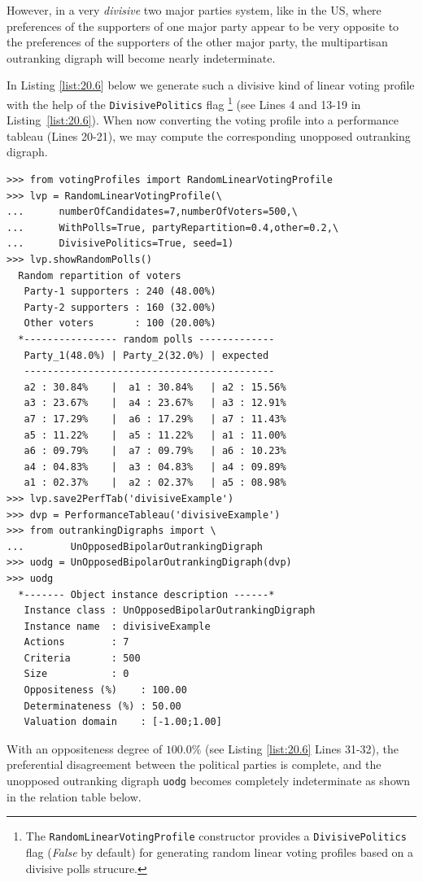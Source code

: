 However, in a very \emph{divisive} two major parties system, like in the US, where preferences of the supporters of one major party appear to be very opposite to the preferences of the supporters of the other major party, the multipartisan outranking digraph will become nearly indeterminate.

In Listing \ref{list:20.6} below we generate such a divisive kind of linear voting profile with the help of the \texttt{DivisivePolitics} flag \footnote{The \texttt{RandomLinearVotingProfile} constructor provides a \texttt{DivisivePolitics} flag (\emph{False} by default) for generating random linear voting profiles based on a divisive polls strucure.} (see Lines 4 and 13-19 in Listing~\ref{list:20.6}). When now converting the voting profile into a performance tableau (Lines 20-21), we may compute the corresponding unopposed outranking digraph.
\begin{lstlisting}[caption={A divisive two-party example of a random linear voting profile},label=list:20.6]
>>> from votingProfiles import RandomLinearVotingProfile		     
>>> lvp = RandomLinearVotingProfile(\
...      numberOfCandidates=7,numberOfVoters=500,\
...      WithPolls=True, partyRepartition=0.4,other=0.2,\
...      DivisivePolitics=True, seed=1)
>>> lvp.showRandomPolls()
  Random repartition of voters
   Party-1 supporters : 240 (48.00%)
   Party-2 supporters : 160 (32.00%)
   Other voters       : 100 (20.00%)
  *---------------- random polls -------------
   Party_1(48.0%) | Party_2(32.0%) | expected  
   -------------------------------------------
   a2 : 30.84%    |  a1 : 30.84%   | a2 : 15.56%
   a3 : 23.67%    |  a4 : 23.67%   | a3 : 12.91%
   a7 : 17.29%    |  a6 : 17.29%   | a7 : 11.43%
   a5 : 11.22%    |  a5 : 11.22%   | a1 : 11.00%
   a6 : 09.79%    |  a7 : 09.79%   | a6 : 10.23%
   a4 : 04.83%    |  a3 : 04.83%   | a4 : 09.89%
   a1 : 02.37%    |  a2 : 02.37%   | a5 : 08.98%
>>> lvp.save2PerfTab('divisiveExample')
>>> dvp = PerformanceTableau('divisiveExample')
>>> from outrankingDigraphs import \
...        UnOpposedBipolarOutrankingDigraph
>>> uodg = UnOpposedBipolarOutrankingDigraph(dvp)
>>> uodg
  *------- Object instance description ------*
   Instance class : UnOpposedBipolarOutrankingDigraph
   Instance name  : divisiveExample
   Actions        : 7
   Criteria       : 500
   Size           : 0
   Oppositeness (%)    : 100.00
   Determinateness (%) : 50.00
   Valuation domain    : [-1.00;1.00]
\end{lstlisting}
With an oppositeness degree of $100.0\%$ (see Listing \ref{list:20.6} Lines 31-32), the preferential disagreement between the political parties is complete, and the unopposed outranking digraph \texttt{uodg} becomes completely indeterminate as shown in the relation table below.
